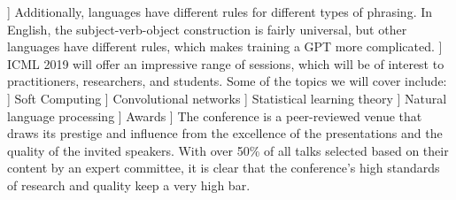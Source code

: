 \documentclass{article}
\begin{document}
{{\1\baselineskip]
Additionally, languages have different rules for different types of phrasing. In English, the subject-verb-object construction is fairly universal, but other languages have different rules, which makes training a GPT more complicated.
\1\baselineskip]
ICML 2019 will offer an impressive range of sessions, which will be of interest to practitioners, researchers, and students. Some of the topics we will cover include:
\1\baselineskip]
Soft Computing
\1\baselineskip]
Convolutional networks
\1\baselineskip]
Statistical learning theory
\1\baselineskip]
Natural language processing
\1\baselineskip]
Awards
\1\baselineskip]
The conference is a peer-reviewed venue that draws its prestige and influence from the excellence of the presentations and the quality of the invited speakers. With over 50\% of all talks selected based on their content by an expert committee, it is clear that the conference's high standards of research and quality keep a very high bar.
}}
\end{document}
